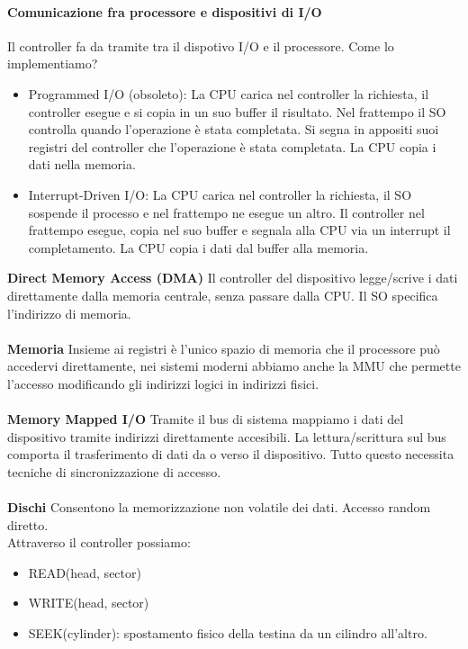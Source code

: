 \documentclass[a4paper,12pt]{article}
\begin{document}
\paragraph{Comunicazione fra processore e dispositivi di I/O} Il controller fa da tramite tra il dispotivo I/O e il processore. Come lo implementiamo?
\begin{itemize}
  \item Programmed I/O (obsoleto): La CPU carica nel controller la richiesta, il controller esegue e si copia in un suo buffer il risultato. Nel frattempo il SO controlla quando l'operazione è stata completata. Si segna in appositi suoi registri del controller che l'operazione è stata completata. La CPU copia i dati nella memoria.
  \item Interrupt-Driven I/O: La CPU carica nel controller la richiesta, il SO sospende il processo e nel frattempo ne esegue un altro. Il controller nel frattempo esegue, copia nel suo buffer e segnala alla CPU via un interrupt il completamento. La CPU copia i dati dal buffer alla memoria. 
\end{itemize}
\vspace{1px}
\textbf{Direct Memory Access (DMA)} Il controller del dispositivo legge/scrive i dati direttamente dalla memoria centrale, senza passare dalla CPU. Il SO specifica l'indirizzo di memoria. \\
\vspace{1px}\\
\textbf{Memoria} Insieme ai registri è l'unico spazio di memoria che il processore può accedervi direttamente, nei sistemi moderni abbiamo anche la MMU che permette l'accesso modificando gli indirizzi logici in indirizzi fisici. \\
\vspace{1px}\\
\textbf{Memory Mapped I/O} Tramite il bus di sistema mappiamo i dati del dispositivo tramite indirizzi direttamente accesibili. La lettura/scrittura sul bus comporta il trasferimento di dati da o verso il dispositivo. Tutto questo necessita tecniche di sincronizzazione di accesso. \\
\vspace{1px}\\
\textbf{Dischi} Consentono la memorizzazione non volatile dei dati. Accesso random diretto. \\
Attraverso il controller possiamo:
\begin{itemize}
  \item READ(head, sector)
  \item WRITE(head, sector)
  \item SEEK(cylinder): spostamento fisico della testina da un cilindro all'altro.
\end{itemize}
\end{document}
